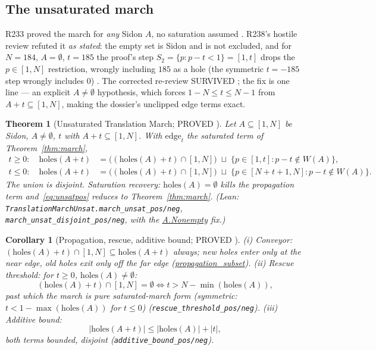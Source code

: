 \documentclass[11pt,a4paper]{article}
\newtheorem{theorem}{Theorem}
\newtheorem{corollary}{Corollary}
\theoremstyle{definition}
\begin{document}
\subsection{The unsaturated march}
\label{sec:unsat}

R233 proved the march for \emph{any} Sidon $A$, no saturation assumed
\cite{D233}. R238's hostile review refuted it \emph{as stated}: the
empty set is Sidon and is not excluded, and for $N=184$, $A=\emptyset$,
$t=185$ the proof's step
$S_2=\{p:p-t<1\}=[1,t]$ drops the $p\in[1,N]$ restriction, wrongly
including $185$ as a hole (the symmetric $t=-185$ step wrongly
includes $0$) \cite{D238}. The corrected re-review SURVIVED
\cite{D246}; the fix is one line --- an explicit $A\ne\emptyset$
hypothesis, which forces $1-N\le t\le N-1$ from $A+t\subseteq[1,N]$,
making the dossier's unclipped edge terms exact.

\begin{theorem}[Unsaturated Translation March; PROVED \cite{D250}]
  \label{thm:unsat}
  Let $A\subseteq[1,N]$ be Sidon, $A\ne\emptyset$, $t$ with
  $A+t\subseteq[1,N]$. With $\mathrm{edge}_t$ the saturated term of
  Theorem~\ref{thm:march},
  \begin{align}
    \label{eq:unsatpos}
    t\ge0:\quad \mathrm{holes}(A+t)
      &= \bigl((\mathrm{holes}(A)+t)\cap[1,N]\bigr)\;\sqcup\;
        \{p\in[1,t]:p-t\notin W(A)\}, \\
    \label{eq:unsatneg}
    t\le0:\quad \mathrm{holes}(A+t)
      &= \bigl((\mathrm{holes}(A)+t)\cap[1,N]\bigr)\;\sqcup\;
        \{p\in[N+t+1,N]:p-t\notin W(A)\}.
  \end{align}
  The union is disjoint. Saturation recovery: $\mathrm{holes}(A)=\emptyset$
  kills the propagation term and~\eqref{eq:unsatpos} reduces to
  Theorem~\ref{thm:march}.
  (Lean: \texttt{TranslationMarchUnsat.march\_unsat\_pos/neg},
  \texttt{march\_unsat\_disjoint\_pos/neg}, with the
  \url{A.Nonempty} fix.)
\end{theorem}

\begin{corollary}[Propagation, rescue, additive bound; PROVED \cite{D250}]
  \label{cor:unsat}
  (i) \emph{Conveyor:}
  $(\mathrm{holes}(A)+t)\cap[1,N]\subseteq\mathrm{holes}(A+t)$ always;
  new holes enter only at the near edge, old holes exit only off the
  far edge (\url{propagation_subset}).
  (ii) \emph{Rescue threshold:} for $t\ge0$,
  $\mathrm{holes}(A)\ne\emptyset$:
  \begin{equation}
    \label{eq:rescue}
    (\mathrm{holes}(A)+t)\cap[1,N]=\emptyset \iff t>N-\min(\mathrm{holes}(A)),
  \end{equation}
  past which the march is pure saturated-march form (symmetric:
  $t<1-\max(\mathrm{holes}(A))$ for $t\le0$)
  (\texttt{rescue\_threshold\_pos/neg}).
  (iii) \emph{Additive bound:}
  \begin{equation}
    \label{eq:additive}
    |\mathrm{holes}(A+t)|\le|\mathrm{holes}(A)|+|t|,
  \end{equation}
  both terms bounded, disjoint
  (\texttt{additive\_bound\_pos/neg}).
\end{corollary}
\end{document}
